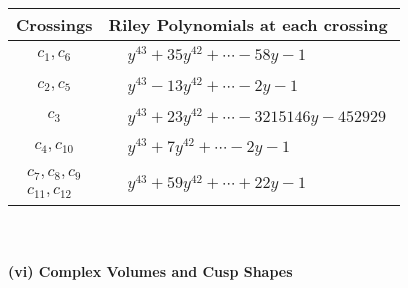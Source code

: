 \documentclass[1p]{elsarticle_modified}
\theoremstyle{definition}
\begin{document}
\begin{tabular}{m{50pt}|m{274pt}}
Crossings & \hspace{64pt}Riley Polynomials at each crossing \\
\hline $$\begin{aligned}c_{1},c_{6}\end{aligned}$$&$\begin{aligned}
&y^{43}+35 y^{42}+\cdots-58 y-1
\end{aligned}$\\
\hline $$\begin{aligned}c_{2},c_{5}\end{aligned}$$&$\begin{aligned}
&y^{43}-13 y^{42}+\cdots-2 y-1
\end{aligned}$\\
\hline $$\begin{aligned}c_{3}\end{aligned}$$&$\begin{aligned}
&y^{43}+23 y^{42}+\cdots-3215146 y-452929
\end{aligned}$\\
\hline $$\begin{aligned}c_{4},c_{10}\end{aligned}$$&$\begin{aligned}
&y^{43}+7 y^{42}+\cdots-2 y-1
\end{aligned}$\\
\hline $$\begin{aligned}c_{7},c_{8},c_{9}\\c_{11},c_{12}\end{aligned}$$&$\begin{aligned}
&y^{43}+59 y^{42}+\cdots+22 y-1
\end{aligned}$\\
\hline
\end{tabular}\\~\\
\newpage\flushleft \textbf{(vi) Complex Volumes and Cusp Shapes}
\end{document}
